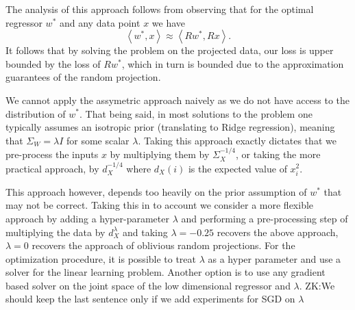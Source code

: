 \documentclass{article}
\theoremstyle{definition}
\theoremstyle{plain}
\newcommand{\X}{\mathbf{X}}
\newcommand{\W}{\mathbf{W}}
\newcommand{\ip}[1]{\left \langle #1 \right \rangle}
\newcommand{\zk}[1]{{\color{blue}ZK:#1}}
\begin{document}
The analysis of this approach follows from observing that for the optimal regressor $w^*$ and any data point $x$ we have 
$$ \ip{w^*,x} \approx \ip{Rw^*, Rx} .$$
It follows that by solving the problem on the projected data, our loss is upper bounded by the loss of $Rw^*$, which in turn is bounded due to the approximation guarantees of the random projection.

We cannot apply the assymetric approach naively as we do not have access to the distribution of $w^*$. That being said, in most solutions to the problem one typically assumes an isotropic prior (translating to Ridge regression), meaning that $\Sigma_W=\lambda I$ for some scalar $\lambda$. Taking this approach exactly dictates that we pre-process the inputs $x$ by multiplying them by $\Sigma_X^{-1/4}$, or taking the more practical approach, by $d_X^{-1/4}$ where $d_X(i)$ is the expected value of $x_i^2$. 

This approach however, depends too heavily on the prior assumption of $w^*$ that may not be correct. Taking this in to account we consider a more flexible approach by adding a hyper-parameter $\lambda$ and performing a pre-processing step of multiplying the data by $d_X^{\lambda}$ and taking $\lambda=-0.25$ recovers the above approach, $\lambda=0$ recovers the approach of oblivious random projections. For the optimization procedure, it is possible to treat $\lambda$ as a hyper parameter and use a solver for the linear learning problem. Another option is to use any gradient based solver on the joint space of the low dimensional regressor and $\lambda$. \zk{We should keep the last sentence only if we add experiments for SGD on $\lambda$}


\end{document}
